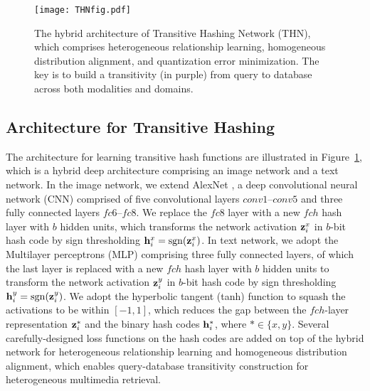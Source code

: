 \documentclass{article}
\begin{document}
\begin{figure}[tbp]
  \centering
  \texttt{[image: THNfig.pdf]}
  \caption{The hybrid architecture of Transitive Hashing Network (THN), which comprises heterogeneous relationship learning, homogeneous distribution alignment, and quantization error minimization. The key is to build a transitivity (in purple) from query to database across both modalities and domains.}
   \label{fig:THN}
\end{figure}

\subsection{Architecture for Transitive Hashing}
The architecture for learning transitive hash functions are illustrated in Figure~\ref{fig:THN}, which is a hybrid deep architecture comprising an image network and a text network. In the image network, we extend AlexNet \cite{cite:NIPS12CNN}, a deep convolutional neural network (CNN) comprised of five convolutional layers $conv1$--$conv5$ and three fully connected layers $fc6$--$fc8$. We replace the $fc8$ layer with a new $fch$ hash layer with $b$ hidden units, which transforms the network activation ${\bf z}_i^x$ in $b$-bit hash code by sign thresholding ${\bf h}^x_{i} = \operatorname{sgn} ({\bf z}_i^{x})$. In text network, we adopt the Multilayer perceptrons (MLP) \cite{cite:MIT86MLP} comprising three fully connected layers, of which the last layer is replaced with a new $fch$ hash layer with $b$ hidden units to transform the network activation ${\bf z}_i^y$ in $b$-bit hash code by sign thresholding ${\bf h}^y_{i} = \operatorname{sgn} ({\bf z}_i^{y})$. We adopt the hyperbolic tangent (tanh) function to squash the activations to be within $[-1,1]$, which reduces the gap between the $fch$-layer representation ${\bf z}_i^{\ast}$ and the binary hash codes ${\bf h}_i^{\ast}$, where $\ast\in\{x,y\}$. Several carefully-designed loss functions on the hash codes are added on top of the hybrid network for heterogeneous relationship learning and homogeneous distribution alignment, which enables query-database transitivity construction for heterogeneous multimedia retrieval.
\end{document}
